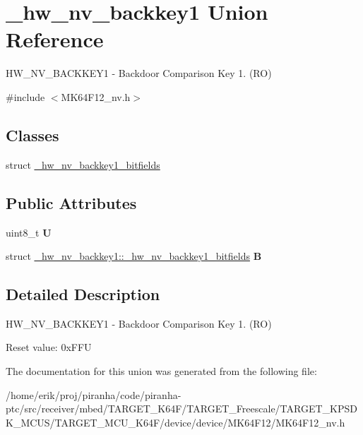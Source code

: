 \hypertarget{union__hw__nv__backkey1}{}\section{\+\_\+hw\+\_\+nv\+\_\+backkey1 Union Reference}
\label{union__hw__nv__backkey1}


H\+W\+\_\+\+N\+V\+\_\+\+B\+A\+C\+K\+K\+E\+Y1 -\/ Backdoor Comparison Key 1. (RO)  




{\ttfamily \#include $<$M\+K64\+F12\+\_\+nv.\+h$>$}

\subsection*{Classes}
\begin{DoxyCompactItemize}
\item 
struct \hyperlink{struct__hw__nv__backkey1_1_1__hw__nv__backkey1__bitfields}{\+\_\+hw\+\_\+nv\+\_\+backkey1\+\_\+bitfields}
\end{DoxyCompactItemize}
\subsection*{Public Attributes}
\begin{DoxyCompactItemize}
\item 
uint8\+\_\+t {\bfseries U}\hypertarget{union__hw__nv__backkey1_abb1c1e9e6ec34f6b24c53bc1d5e9678f}{}\label{union__hw__nv__backkey1_abb1c1e9e6ec34f6b24c53bc1d5e9678f}

\item 
struct \hyperlink{struct__hw__nv__backkey1_1_1__hw__nv__backkey1__bitfields}{\+\_\+hw\+\_\+nv\+\_\+backkey1\+::\+\_\+hw\+\_\+nv\+\_\+backkey1\+\_\+bitfields} {\bfseries B}\hypertarget{union__hw__nv__backkey1_abdcdad6dfcb03d63e312d6f4e2cb3269}{}\label{union__hw__nv__backkey1_abdcdad6dfcb03d63e312d6f4e2cb3269}

\end{DoxyCompactItemize}


\subsection{Detailed Description}
H\+W\+\_\+\+N\+V\+\_\+\+B\+A\+C\+K\+K\+E\+Y1 -\/ Backdoor Comparison Key 1. (RO) 

Reset value\+: 0x\+F\+FU 

The documentation for this union was generated from the following file\+:\begin{DoxyCompactItemize}
\item 
/home/erik/proj/piranha/code/piranha-\/ptc/src/receiver/mbed/\+T\+A\+R\+G\+E\+T\+\_\+\+K64\+F/\+T\+A\+R\+G\+E\+T\+\_\+\+Freescale/\+T\+A\+R\+G\+E\+T\+\_\+\+K\+P\+S\+D\+K\+\_\+\+M\+C\+U\+S/\+T\+A\+R\+G\+E\+T\+\_\+\+M\+C\+U\+\_\+\+K64\+F/device/device/\+M\+K64\+F12/M\+K64\+F12\+\_\+nv.\+h\end{DoxyCompactItemize}
